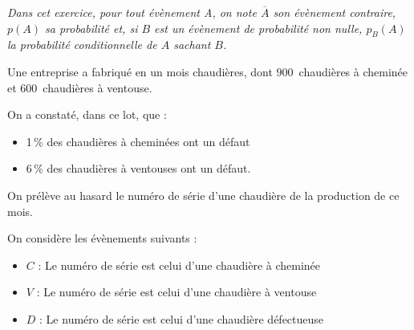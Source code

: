 \medskip

\emph{Dans cet exercice, pour tout évènement A, on note $\overline{A}$ son évènement contraire, $p(A)$ sa probabilité et, si $B$ est un évènement de probabilité non nulle, $p_B(A)$ la probabilité conditionnelle de $A$ sachant $B$.}

\medskip

Une entreprise a fabriqué en un mois  chaudières, dont $900$~chaudières à
cheminée et $600$~chaudières à ventouse.

On a constaté, dans ce lot, que :

\begin{itemize}
\item 1\,\% des chaudières à cheminées ont un défaut
\item 6\,\% des chaudières à ventouses ont un défaut.
\end{itemize}

On prélève au hasard le numéro de série d'une chaudière de la production de ce
mois.

On considère les évènements suivants :

\begin{itemize}
\item $C$ : \og Le numéro de série est celui d'une chaudière à cheminée \fg
\item $V$ : \og Le numéro de série est celui d'une chaudière à ventouse \fg
\item $D$ : \og Le numéro de série est celui d'une chaudière défectueuse \fg
\end{itemize}

\medskip

